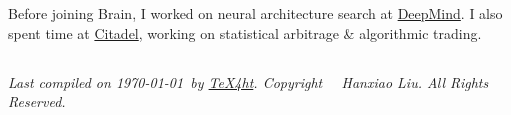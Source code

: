 \documentclass{article}
\begin{document}
\noindent Before joining Brain,
I worked on neural architecture search at \href{https://deepmind.com/}{DeepMind}.
I also spent time at \href{https://www.citadel.com/}{Citadel}, working on statistical arbitrage \& algorithmic trading.

\subsection*{}
\footnotesize{
    \textit{
        Last compiled on \today\ by \href{http://www.tug.org/tex4ht/}{\TeX4ht}. \newline
        Copyright \textcopyright\ \the\year\ Hanxiao Liu. All Rights Reserved.
    }
}
\end{document}
